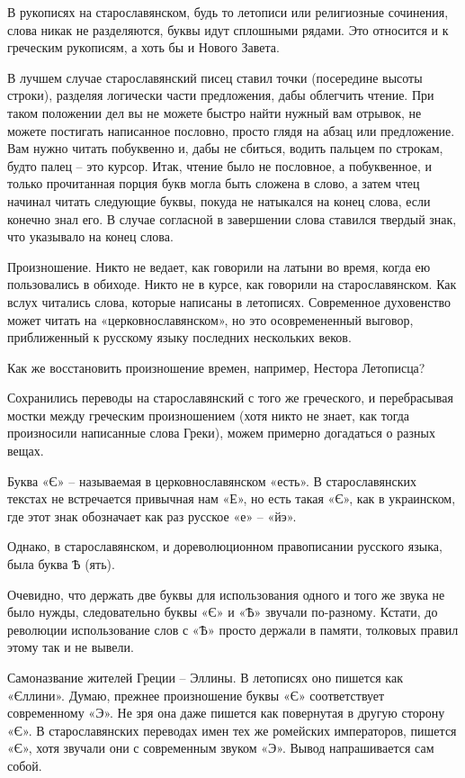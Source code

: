 \documentclass[a5paper,11pt,openany]{article}
\begin{document}
В рукописях на старославянском, будь то летописи или религиозные сочинения, слова никак не разделяются, буквы идут сплошными рядами. Это относится и к греческим рукописям, а хоть бы и Нового Завета.

В лучшем случае старославянский писец ставил точки (посередине высоты строки), разделяя логически части предложения, дабы облегчить чтение. При таком положении дел вы не можете быстро найти нужный вам отрывок, не можете постигать написанное пословно, просто глядя на абзац или предложение. Вам нужно читать побуквенно и, дабы не сбиться, водить пальцем  по строкам, будто палец – это курсор. Итак, чтение было не пословное, а побуквенное, и только прочитанная порция букв могла быть сложена в слово, а затем чтец начинал читать следующие буквы, покуда не натыкался на конец слова, если конечно знал его. В случае согласной в завершении слова ставился твердый знак, что указывало на конец слова.

Произношение. Никто не ведает, как говорили на латыни во время, когда ею пользовались в обиходе. Никто не в курсе, как говорили на старославянском. Как вслух читались слова, которые написаны в летописях. Современное духовенство может читать на «церковнославянском», но это осовремененный выговор, приближенный к русскому языку последних нескольких веков.

Как же восстановить произношение времен, например, Нестора Летописца?

Сохранились переводы на старославянский с того же греческого, и перебрасывая мостки между греческим произношением (хотя никто не знает, как тогда произносили написанные слова Греки), можем примерно догадаться о разных вещах.

Буква «Є» – называемая в церковнославянском «есть». В старославянских текстах не встречается привычная нам «Е», но есть такая «Є», как в украинском, где этот знак обозначает как раз русское «е» – «йэ».

Однако, в старославянском, и дореволюционном правописании русского языка, была буква Ѣ (ять).

Очевидно, что держать две буквы для использования одного и того же звука не было нужды, следовательно буквы «Є» и «Ѣ» звучали по-разному. Кстати, до революции использование слов с «Ѣ» просто держали в памяти, толковых правил этому так и не вывели. 

Самоназвание жителей Греции  – Эллины. В летописях оно пишется как «Єллини». Думаю, прежнее произношение буквы «Є» соответствует современному «Э». Не зря она даже пишется как повернутая в другую сторону «Є». В старославянских переводах имен тех же ромейских императоров, пишется «Є», хотя звучали они с современным звуком «Э». Вывод напрашивается сам собой.
\end{document}
